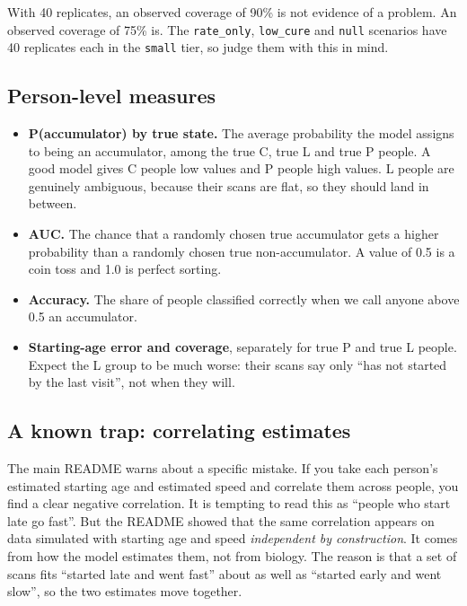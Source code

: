 \documentclass[11pt]{article}
\newcommand{\code}[1]{\texttt{\small #1}}
\begin{document}
\begin{caution}
With 40 replicates, an observed coverage of 90\% is not evidence of a problem. An observed coverage of 75\% is. The \code{rate\_only}, \code{low\_cure} and \code{null} scenarios have 40 replicates each in the \code{small} tier, so judge them with this in mind.
\end{caution}

\subsection{Person-level measures}

\begin{itemize}
  \item \textbf{P(accumulator) by true state.} The average probability the model assigns to being an accumulator, among the true C, true L and true P people. A good model gives C people low values and P people high values. L people are genuinely ambiguous, because their scans are flat, so they should land in between.
  \item \textbf{AUC.} The chance that a randomly chosen true accumulator gets a higher probability than a randomly chosen true non-accumulator. A value of 0.5 is a coin toss and 1.0 is perfect sorting.
  \item \textbf{Accuracy.} The share of people classified correctly when we call anyone above 0.5 an accumulator.
  \item \textbf{Starting-age error and coverage}, separately for true P and true L people. Expect the L group to be much worse: their scans say only ``has not started by the last visit'', not when they will.
\end{itemize}

\subsection{A known trap: correlating estimates}\label{sec:pitfall}

The main README warns about a specific mistake. If you take each person's estimated starting age and estimated speed and correlate them across people, you find a clear negative correlation. It is tempting to read this as ``people who start late go fast''. But the README showed that the same correlation appears on data simulated with starting age and speed \emph{independent by construction}. It comes from how the model estimates them, not from biology. The reason is that a set of scans fits ``started late and went fast'' about as well as ``started early and went slow'', so the two estimates move together.
\end{document}
